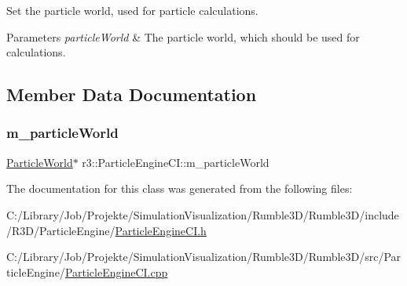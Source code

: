 Set the particle world, used for particle calculations. 


\begin{DoxyParams}{Parameters}
{\em particle\+World} & The particle world, which should be used for calculations. \\
\hline
\end{DoxyParams}


\subsection{Member Data Documentation}
\mbox{\label{classr3_1_1_particle_engine_c_i_ad13321df475d526a7a2ed34e46cc10ee}} 
\subsubsection{\texorpdfstring{m\+\_\+particle\+World}{m\_particleWorld}}
{\footnotesize\ttfamily \mbox{\hyperlink{classr3_1_1_particle_world}{Particle\+World}}$\ast$ r3\+::\+Particle\+Engine\+C\+I\+::m\+\_\+particle\+World\hspace{0.3cm}{\ttfamily [protected]}}



The documentation for this class was generated from the following files\+:\begin{DoxyCompactItemize}
\item 
C\+:/\+Library/\+Job/\+Projekte/\+Simulation\+Visualization/\+Rumble3\+D/\+Rumble3\+D/include/\+R3\+D/\+Particle\+Engine/\mbox{\hyperlink{_particle_engine_c_i_8h}{Particle\+Engine\+C\+I.\+h}}\item 
C\+:/\+Library/\+Job/\+Projekte/\+Simulation\+Visualization/\+Rumble3\+D/\+Rumble3\+D/src/\+Particle\+Engine/\mbox{\hyperlink{_particle_engine_c_i_8cpp}{Particle\+Engine\+C\+I.\+cpp}}\end{DoxyCompactItemize}
